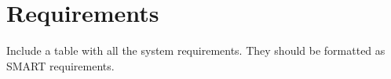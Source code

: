 \chapter{Requirements} \label{chap:requirements}

Include a table with all the system requirements. They should be formatted as SMART requirements.